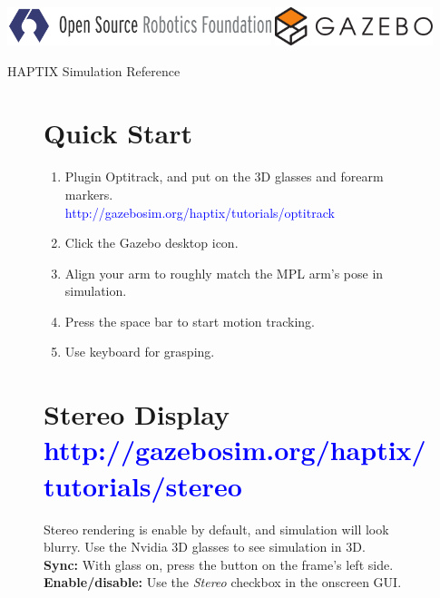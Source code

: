 \documentclass[11pt, letterpaper, landscape]{article}
\begin{document}
\clearpage
\thispagestyle{empty}
\pagestyle{empty}
\small
\includegraphics[height=3.0em]{osrf-pos-horz-pms5265}
\hspace{0.51\textwidth}%
\includegraphics[height=3.0em]{gazebo.pdf}

\begin{center}
{\LARGE HAPTIX Simulation Reference}%
\end{center}

\begin{figure}[!htb]
  \centering
  \begin{minipage}[t]{0.48\textwidth}
    \begin{tcolorbox}[height=6.5cm,colback=gray!8,colframe=gray!15]
      \section*{Quick Start}
      \begin{enumerate}
        \item Plugin Optitrack, and put on the 3D glasses and forearm markers.\\
          \textcolor{blue}{http://gazebosim.org/haptix/tutorials/optitrack}
        \item Click the Gazebo desktop icon.
        \item Align your arm to roughly match the MPL arm's pose in simulation.
        \item Press the space bar to start motion tracking.
        \item Use keyboard for grasping.
      \end{enumerate}
    \end{tcolorbox}
  \end{minipage}%
  \hspace{0.02\textwidth}%
  \begin{minipage}[t]{0.48\textwidth}
    \begin{tcolorbox}[height=6.5cm,colback=gray!8,colframe=gray!15]
      \section*{Stereo Display \textcolor{blue}{\textnormal{\small http://gazebosim.org/haptix/tutorials/stereo}}}
      Stereo rendering is enable by default, and simulation will look blurry. Use the Nvidia 3D glasses to see simulation in 3D.\\

      {\bf Sync:} With glass on, press the button on the frame's left side.\\
      {\bf Enable/disable:} Use the {\em Stereo} checkbox in the onscreen GUI.\\
    \end{tcolorbox}
  \end{minipage}
\end{figure}
\end{document}
